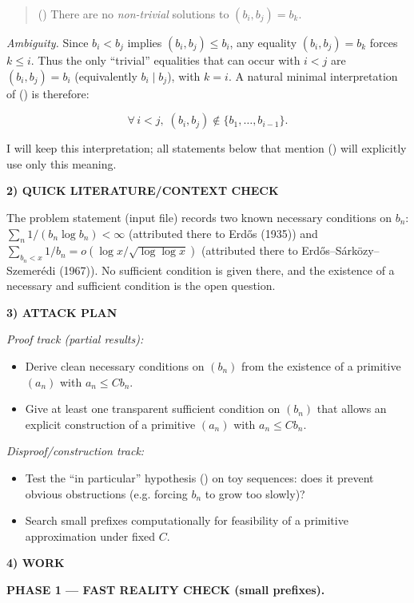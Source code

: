 \begin{quote}
(\*) There are no \emph{non-trivial} solutions to $(b_i,b_j)=b_k$.
\end{quote}

\emph{Ambiguity.} Since $b_i<b_j$ implies $(b_i,b_j)\le b_i$, any equality
$(b_i,b_j)=b_k$ forces $k\le i$. Thus the only “trivial” equalities that can
occur with $i<j$ are $(b_i,b_j)=b_i$ (equivalently $b_i\mid b_j$), with $k=i$.
A natural minimal interpretation of (\*) is therefore:

\[ \forall\, i<j,\; (b_i,b_j)\notin\{b_1,\dots,b_{i-1}\}. \]

I will keep this interpretation; all statements below that mention (\*) will
explicitly use only this meaning.

\medskip
\noindent\textbf{2) QUICK LITERATURE/CONTEXT CHECK}

The problem statement (input file) records two known necessary conditions on $b_n$:
\(\sum_n 1/(b_n\log b_n)<\infty\) (attributed there to Erd\H{o}s (1935)) and
\(\sum_{b_n<x}1/b_n = o(\log x/\sqrt{\log\log x})\) (attributed there to
Erd\H{o}s--S\'{a}rk\"{o}zy--Szemer\'{e}di (1967)).
No sufficient condition is given there, and the existence of a necessary and
sufficient condition is the open question.

\medskip
\noindent\textbf{3) ATTACK PLAN}

\emph{Proof track (partial results):}
\begin{itemize}
\item Derive clean necessary conditions on $(b_n)$ from the existence of a
primitive $(a_n)$ with $a_n\le Cb_n$.
\item Give at least one transparent sufficient condition on $(b_n)$ that allows
an explicit construction of a primitive $(a_n)$ with $a_n\le Cb_n$.
\end{itemize}

\emph{Disproof/construction track:}
\begin{itemize}
\item Test the “in particular” hypothesis (\*) on toy sequences: does it prevent
obvious obstructions (e.g. forcing $b_n$ to grow too slowly)?
\item Search small prefixes computationally for feasibility of a primitive
approximation under fixed $C$.
\end{itemize}

\medskip
\noindent\textbf{4) WORK}

\textbf{PHASE 1 — FAST REALITY CHECK (small prefixes).}

